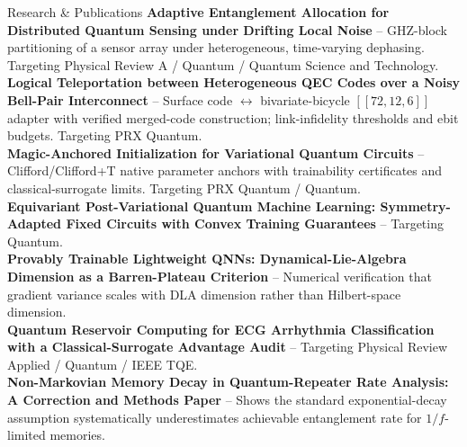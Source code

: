 \documentclass{resume} %
\begin{document}
\begin{rSection}{Research \& Publications}
{\textbf{Adaptive Entanglement Allocation for Distributed Quantum Sensing under Drifting Local Noise}} – GHZ-block partitioning of a sensor array under heterogeneous, time-varying dephasing. Targeting Physical Review A / Quantum / Quantum Science and Technology.\vspace{.1cm} \\
{\textbf{Logical Teleportation between Heterogeneous QEC Codes over a Noisy Bell-Pair Interconnect}} – Surface code $\leftrightarrow$ bivariate-bicycle $[[72,12,6]]$ adapter with verified merged-code construction; link-infidelity thresholds and ebit budgets. Targeting PRX Quantum.\vspace{.1cm} \\
{\textbf{Magic-Anchored Initialization for Variational Quantum Circuits}} – Clifford/Clifford+T native parameter anchors with trainability certificates and classical-surrogate limits. Targeting PRX Quantum / Quantum.\vspace{.1cm} \\
{\textbf{Equivariant Post-Variational Quantum Machine Learning: Symmetry-Adapted Fixed Circuits with Convex Training Guarantees}} – Targeting Quantum.\vspace{.1cm} \\
{\textbf{Provably Trainable Lightweight QNNs: Dynamical-Lie-Algebra Dimension as a Barren-Plateau Criterion}} – Numerical verification that gradient variance scales with DLA dimension rather than Hilbert-space dimension.\vspace{.1cm} \\
{\textbf{Quantum Reservoir Computing for ECG Arrhythmia Classification with a Classical-Surrogate Advantage Audit}} – Targeting Physical Review Applied / Quantum / IEEE TQE.\vspace{.1cm} \\
{\textbf{Non-Markovian Memory Decay in Quantum-Repeater Rate Analysis: A Correction and Methods Paper}} – Shows the standard exponential-decay assumption systematically underestimates achievable entanglement rate for $1/f$-limited memories.

\end{rSection}
\end{document}
